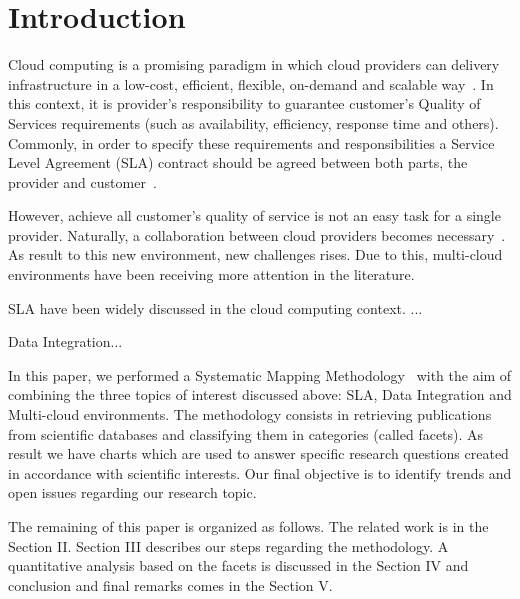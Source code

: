 \section{Introduction}
\label{sec:intro}

Cloud computing is a promising paradigm in which cloud providers can delivery infrastructure in 
a low-cost, efficient, flexible, on-demand and scalable way~\cite{014}.
In this context, it is provider's responsibility to guarantee customer's Quality of Services 
requirements (such as availability, efficiency, response time and others).
Commonly, in order to specify these requirements and responsibilities a Service Level Agreement (SLA)
contract should be agreed between both parts, the provider and customer~\cite{011}.

However, achieve all customer's quality of service is not an easy task for a single provider.
Naturally, a collaboration between cloud providers becomes necessary~\cite{036}.
As result to this new environment, new challenges rises.
Due to this, multi-cloud environments have been receiving more attention in the literature.

SLA have been widely discussed in the cloud computing context. ...

Data Integration...

In this paper, we performed a Systematic Mapping Methodology~\cite{SM:Petersen:2008} with the aim of
combining the three topics of interest discussed above: SLA, Data Integration and Multi-cloud environments.
The methodology consists in retrieving publications from scientific databases and classifying them in
categories (called facets). As result we have charts which are used to answer specific research questions
created in accordance with scientific interests. 
Our final objective is to identify trends and open issues regarding our research topic.

The remaining of this paper is organized as follows. 
The related work is in the Section II. 
Section III describes our steps regarding the methodology.
A quantitative analysis based on the facets is discussed in the Section IV and conclusion and final
remarks comes in the Section V.